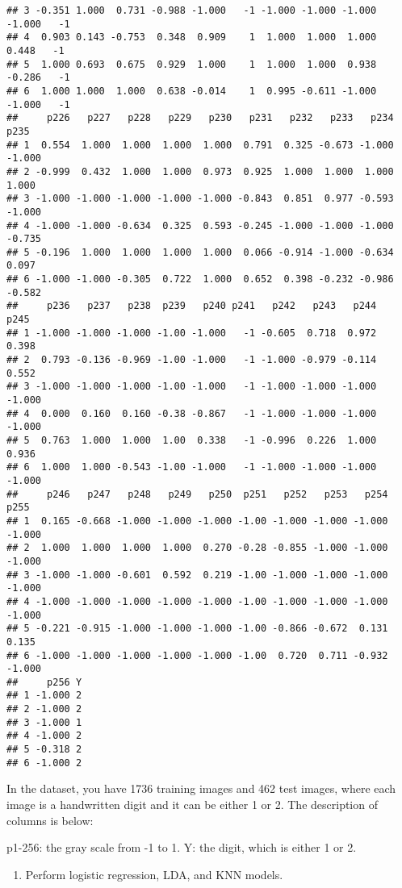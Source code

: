 \documentclass[]{article}
\providecommand{\tightlist}{%
  \setlength{\itemsep}{0pt}\setlength{\parskip}{0pt}}
\begin{document}
\begin{verbatim}
## 3 -0.351 1.000  0.731 -0.988 -1.000   -1 -1.000 -1.000 -1.000 -1.000   -1
## 4  0.903 0.143 -0.753  0.348  0.909    1  1.000  1.000  1.000  0.448   -1
## 5  1.000 0.693  0.675  0.929  1.000    1  1.000  1.000  0.938 -0.286   -1
## 6  1.000 1.000  1.000  0.638 -0.014    1  0.995 -0.611 -1.000 -1.000   -1
##     p226   p227   p228   p229   p230   p231   p232   p233   p234   p235
## 1  0.554  1.000  1.000  1.000  1.000  0.791  0.325 -0.673 -1.000 -1.000
## 2 -0.999  0.432  1.000  1.000  0.973  0.925  1.000  1.000  1.000  1.000
## 3 -1.000 -1.000 -1.000 -1.000 -1.000 -0.843  0.851  0.977 -0.593 -1.000
## 4 -1.000 -1.000 -0.634  0.325  0.593 -0.245 -1.000 -1.000 -1.000 -0.735
## 5 -0.196  1.000  1.000  1.000  1.000  0.066 -0.914 -1.000 -0.634  0.097
## 6 -1.000 -1.000 -0.305  0.722  1.000  0.652  0.398 -0.232 -0.986 -0.582
##     p236   p237   p238  p239   p240 p241   p242   p243   p244   p245
## 1 -1.000 -1.000 -1.000 -1.00 -1.000   -1 -0.605  0.718  0.972  0.398
## 2  0.793 -0.136 -0.969 -1.00 -1.000   -1 -1.000 -0.979 -0.114  0.552
## 3 -1.000 -1.000 -1.000 -1.00 -1.000   -1 -1.000 -1.000 -1.000 -1.000
## 4  0.000  0.160  0.160 -0.38 -0.867   -1 -1.000 -1.000 -1.000 -1.000
## 5  0.763  1.000  1.000  1.00  0.338   -1 -0.996  0.226  1.000  0.936
## 6  1.000  1.000 -0.543 -1.00 -1.000   -1 -1.000 -1.000 -1.000 -1.000
##     p246   p247   p248   p249   p250  p251   p252   p253   p254   p255
## 1  0.165 -0.668 -1.000 -1.000 -1.000 -1.00 -1.000 -1.000 -1.000 -1.000
## 2  1.000  1.000  1.000  1.000  0.270 -0.28 -0.855 -1.000 -1.000 -1.000
## 3 -1.000 -1.000 -0.601  0.592  0.219 -1.00 -1.000 -1.000 -1.000 -1.000
## 4 -1.000 -1.000 -1.000 -1.000 -1.000 -1.00 -1.000 -1.000 -1.000 -1.000
## 5 -0.221 -0.915 -1.000 -1.000 -1.000 -1.00 -0.866 -0.672  0.131  0.135
## 6 -1.000 -1.000 -1.000 -1.000 -1.000 -1.00  0.720  0.711 -0.932 -1.000
##     p256 Y
## 1 -1.000 2
## 2 -1.000 2
## 3 -1.000 1
## 4 -1.000 2
## 5 -0.318 2
## 6 -1.000 2
\end{verbatim}

In the dataset, you have 1736 training images and 462 test images, where
each image is a handwritten digit and it can be either 1 or 2. The
description of columns is below:

p1-256: the gray scale from -1 to 1. Y: the digit, which is either 1 or
2.

\begin{enumerate}
\def\labelenumi{(\alph{enumi})}
\tightlist
\item
  Perform logistic regression, LDA, and KNN models.
\end{enumerate}
\end{document}
